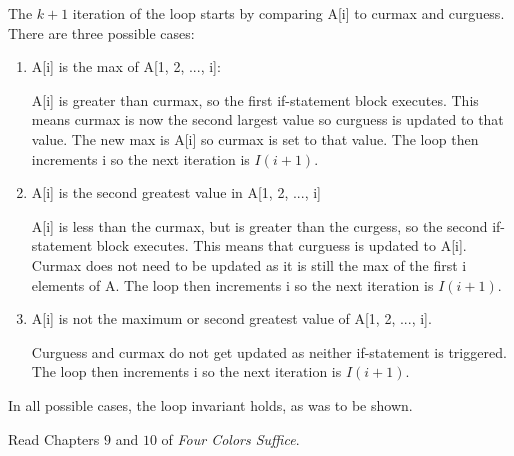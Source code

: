 \documentclass{article}
\begin{document}
\begin{enumerate}
\begin{enumerate}
	The $k+1$ iteration of the loop starts by comparing A[i] to curmax and curguess. There are three possible cases:
	
	\begin{enumerate}
	\item A[i] is the max of A[1, 2, ..., i]:
	
	A[i] is greater than curmax, so the first if-statement block executes. This means curmax is now the second largest value so curguess is updated to that value. 
	The new max is A[i] so curmax is set to that value. The loop then increments i so the next iteration is $I(i+1)$.
	
	\item A[i] is the second greatest value in A[1, 2, ..., i]
	
	A[i] is less than the curmax, but is greater than the curgess, so the second if-statement block executes. This means that curguess is updated to A[i]. 
	Curmax does not need to be updated as it is still the max of the first i elements of A. The loop then increments i so the next iteration is $I(i+1)$.
	
	\item A[i] is not the maximum or second greatest value of A[1, 2, ..., i].
	
	Curguess and curmax do not get updated as neither if-statement is triggered.  The loop then increments i so the next iteration is $I(i+1)$.
\end{enumerate}


	In all possible cases, the loop invariant holds, as was to be shown.
\end{enumerate}
\end{enumerate}



 

Read Chapters $9$ and $10$ of \emph{Four Colors Suffice}.
\end{document}
